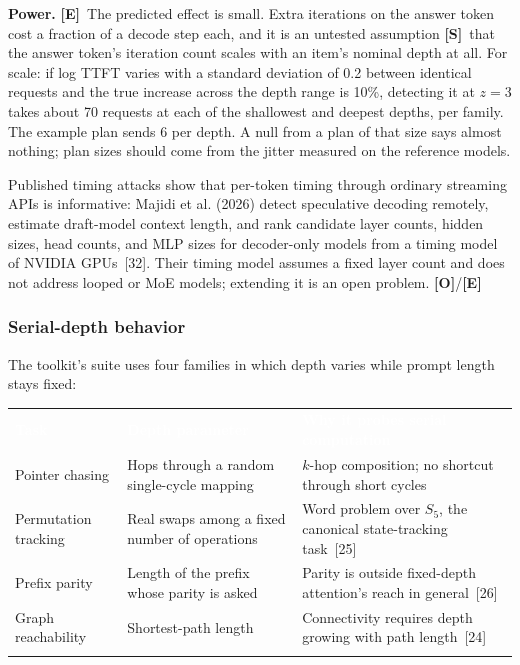 \documentclass[11pt,letterpaper]{article}
\newcommand{\hd}[1]{\textcolor{white}{\bfseries #1}}
\newcommand{\tablefinish}{\arrayrulecolor{deepindigo}\specialrule{0.8pt}{0pt}{0pt}\arrayrulecolor{black}}
\newcommand{\zebra}{\rowcolors{2}{white}{paleindigo!75}}
\newcommand{\mO}{\textcolor{sensorteal}{\textbf{[O]}}}
\newcommand{\mE}{\textcolor{deepindigo}{\textbf{[E]}}}
\newcommand{\mS}{\textcolor{darkamber}{\textbf{[S]}}}
\begin{document}
\textbf{Power.} \mE\ The predicted effect is small. Extra iterations on the answer token cost a fraction of a decode step each, and it is an untested assumption \mS\ that the answer token's iteration count scales with an item's nominal depth at all. For scale: if log TTFT varies with a standard deviation of 0.2 between identical requests and the true increase across the depth range is 10\%, detecting it at $z = 3$ takes about 70 requests at each of the shallowest and deepest depths, per family. The example plan sends 6 per depth. A null from a plan of that size says almost nothing; plan sizes should come from the jitter measured on the reference models.

Published timing attacks show that per-token timing through ordinary streaming APIs is informative: Majidi et al. (2026) detect speculative decoding remotely, estimate draft-model context length, and rank candidate layer counts, hidden sizes, head counts, and MLP sizes for decoder-only models from a timing model of NVIDIA GPUs~[32]. Their timing model assumes a fixed layer count and does not address looped or MoE models; extending it is an open problem. \mO/\mE

\subsubsection{Serial-depth behavior}
\label{sec:behavior}

The toolkit's suite uses four families in which depth varies while prompt length stays fixed:

{\footnotesize
\zebra
\begin{tabularx}{\textwidth}{L{3.0cm} L{4.6cm} Y}
\hd{Task} & \hd{Depth parameter} & \hd{Why it probes serial computation} \\
Pointer chasing & Hops through a random single-cycle mapping & $k$-hop composition; no shortcut through short cycles \\
Permutation tracking & Real swaps among a fixed number of operations & Word problem over $S_5$, the canonical state-tracking task~[25] \\
Prefix parity & Length of the prefix whose parity is asked & Parity is outside fixed-depth attention's reach in general~[26] \\
Graph reachability & Shortest-path length & Connectivity requires depth growing with path length~[24] \\
\tablefinish
\end{tabularx}\par}
\medskip
\end{document}
